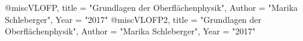 \documentclass[a4paper,12pt,twoside]{article}
\begin{document}
@misc{VLOFP,
title = "Grundlagen der Oberflächenphysik",
Author = "Marika Schleberger",
Year = "2017"
}
@misc{VLOFP2,
title = "Grundlagen der Oberflächenphysik",
Author = "Marika Schleberger",
Year = "2017"
}
\end{document}
